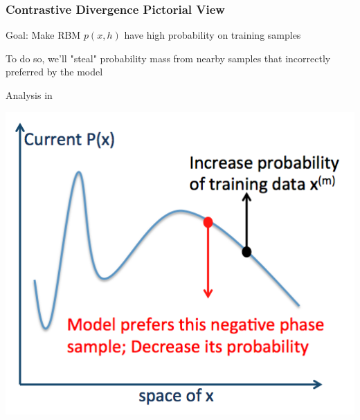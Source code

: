 \begin{frame}
\frametitle{Contrastive Divergence Pictorial View}
\bi
\item Goal: Make RBM $p(x,h)$ have high probability on training samples
\item To do so, we'll "steal" probability mass from nearby samples that incorrectly preferred by the model
\item Analysis in \cite{carreira05cd}  
\ei
\centerline{\includegraphics[scale=0.4]{figs/contrastive_divergence}}
\end{frame}


